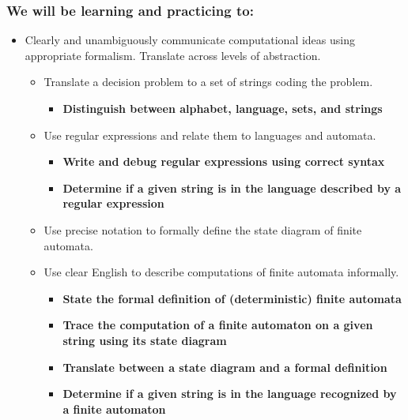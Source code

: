 \subsubsection*{We will be learning and practicing to:}
\begin{itemize}
\item Clearly and unambiguously communicate computational ideas using appropriate formalism. Translate across levels of abstraction.
\begin{itemize}
   \item Translate a decision problem to a set of strings coding the problem.
   \begin{itemize}
   \item {\bf Distinguish between alphabet, language, sets, and strings}
   \end{itemize}
   \item Use regular expressions and relate them to languages and automata.
   \begin{itemize}
      \item {\bf Write and debug regular expressions using correct syntax}
      \item {\bf Determine if a given string is in the language described by a regular expression}
   \end{itemize}
   \item Use precise notation to formally define the state diagram of finite automata.
   \item Use clear English to describe computations of finite automata informally.
   \begin{itemize}
      \item {\bf State the formal definition of (deterministic) finite automata}   
      \item {\bf Trace the computation of a finite automaton on a given string using its state diagram}
      \item {\bf Translate between a state diagram and a formal definition}
      \item {\bf Determine if a given string is in the language recognized by a finite automaton}
   \end{itemize}
\end{itemize}


\end{itemize}
